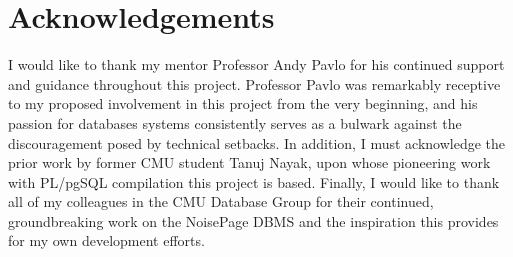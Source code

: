 \documentclass{vldb}
\begin{document}

\section*{Acknowledgements}

I would like to thank my mentor Professor Andy Pavlo for his continued support and guidance throughout this project. Professor Pavlo was remarkably receptive to my proposed involvement in this project from the very beginning, and his passion for databases systems consistently serves as a bulwark against the discouragement posed by technical setbacks. In addition, I must acknowledge the prior work by former CMU student Tanuj Nayak, upon whose pioneering work with PL/pgSQL compilation this project is based. Finally, I would like to thank all of my colleagues in the CMU Database Group for their continued, groundbreaking work on the NoisePage DBMS and the inspiration this provides for my own development efforts.


\newcommand{\newblock}{}

\newpage
\balance


\end{document}
